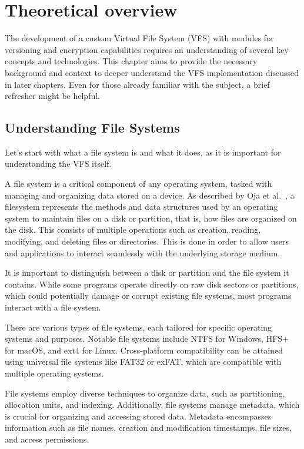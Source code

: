 \chapter{Theoretical overview}
\label{chap:refs}

The development of a custom Virtual File System (VFS) with modules for versioning and encryption capabilities requires an understanding of several key concepts and technologies.
This chapter aims to provide the necessary background and context to deeper understand the VFS implementation discussed in later chapters.
Even for those already familiar with the subject, a brief refresher might be helpful.


\section{Understanding File Systems}\label{sec:file-systems}

Let's start with what a file system is and what it does, as it is important for understanding the VFS itself.

A file system is a critical component of any operating system, tasked with managing and organizing data stored on a device.
As described by Oja et al.~\cite{oja-fs}, a filesystem represents the methods and data structures used by an operating system to maintain files on a disk or partition, that is, how files are organized on the disk.
This consists of multiple operations such as creation, reading, modifying, and deleting files or directories.
This is done in order to allow users and applications to interact seamlessly with the underlying storage medium.

It is important to distinguish between a disk or partition and the file system it contains.
While some programs operate directly on raw disk sectors or partitions, which could potentially damage or corrupt existing file systems, most programs interact with a file system.

There are various types of file systems, each tailored for specific operating systems and purposes.
Notable file systems include NTFS for Windows, HFS+ for macOS, and ext4 for Linux.
Cross-platform compatibility can be attained using universal file systems like FAT32 or exFAT, which are compatible with multiple operating systems.

File systems employ diverse techniques to organize data, such as partitioning, allocation units, and indexing.
Additionally, file systems manage metadata, which is crucial for organizing and accessing stored data.
Metadata encompasses information such as file names, creation and modification timestamps, file sizes, and access permissions.


